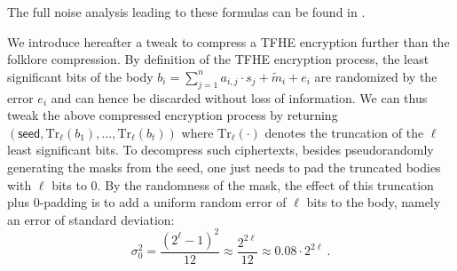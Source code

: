 The full noise analysis leading to these formulas can be found in \cite{phd_tap}.


\fi

We introduce hereafter a tweak to compress a TFHE encryption further than the folklore compression. By definition of the TFHE encryption process, the least significant bits of the body $b_i = \sum_{j=1}^n a_{i,j} \cdot s_j + \tilde{m}_i + e_i$ are randomized by the error $e_i$ and can hence be discarded without loss of information. We can thus tweak the above compressed encryption process by returning $(\mathsf{seed}, \mathrm{Tr}_\ell(b_1), \ldots, \mathrm{Tr}_\ell(b_t))$ where $\mathrm{Tr}_\ell(\cdot)$ denotes the truncation of the $\ell$ least significant bits. To decompress such ciphertexts, besides pseudorandomly generating the masks from the seed, one just needs to pad the truncated bodies with $\ell$ bits to $0$. By the randomness of the mask, the effect of this truncation plus $0$-padding is to add a uniform random error of $\ell$ bits to the body, namely an error of standard deviation: 
$$\sigma_0^2  = \frac{(2^\ell - 1)^2}{12} \approx \frac{2^{2\ell}}{12} \approx 0.08 \cdot 2^{2\ell} ~.$$


